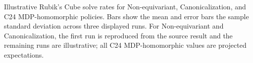 \caption{Illustrative Rubik's Cube solve rates for Non-equivariant, Canonicalization, and C24 MDP-homomorphic policies. Bars show the mean and error bars the sample standard deviation across three displayed runs. For Non-equivariant and Canonicalization, the first run is reproduced from the source result and the remaining runs are illustrative; all C24 MDP-homomorphic values are projected expectations.}
\label{fig:rubik-c24-illustrative}
